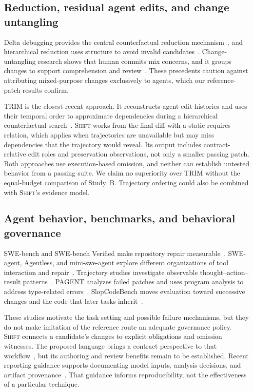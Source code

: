 \documentclass[a4paper,fleqn]{cas-sc}
\newcommand{\tool}{\textsc{Shift}}
\begin{document}
\subsection{Reduction, residual agent edits, and change untangling}

Delta debugging provides the central counterfactual reduction mechanism~\citep{zeller1999yesterday,zeller2002ddmin}, and hierarchical reduction uses structure to avoid invalid candidates~\citep{misherghi2006hdd}. Change-untangling research shows that human commits mix concerns, and it groups changes to support comprehension and review~\citep{herzig2013tangled,barnett2015untangle,dias2015untangling}. These precedents caution against attributing mixed-purpose changes exclusively to agents, which our reference-patch results confirm.

TRIM is the closest recent approach. It reconstructs agent edit histories and uses their temporal order to approximate dependencies during a hierarchical counterfactual search~\citep{mathai2026trim}. \tool{} works from the final diff with a static requires relation, which applies when trajectories are unavailable but may miss dependencies that the trajectory would reveal. Its output includes contract-relative edit roles and preservation observations, not only a smaller passing patch. Both approaches use execution-based omission, and neither can establish untested behavior from a passing suite. We claim no superiority over TRIM without the equal-budget comparison of Study~B. Trajectory ordering could also be combined with \tool{}'s evidence model.

\subsection{Agent behavior, benchmarks, and behavioral governance}

SWE-bench and SWE-bench Verified make repository repair measurable~\citep{jimenez2024swebench,chowdhury2024verified}. SWE-agent, Agentless, and mini-swe-agent explore different organizations of tool interaction and repair~\citep{yang2024sweagent,xia2025agentless,miniswe2025}. Trajectory studies investigate observable thought--action--result patterns~\citep{bouzenia2025trajectories}. PAGENT analyzes failed patches and uses program analysis to address type-related errors~\citep{xue2025pagent}. SlopCodeBench moves evaluation toward successive changes and the code that later tasks inherit~\citep{orlanski2026slopcodebench}.

These studies motivate the task setting and possible failure mechanisms, but they do not make imitation of the reference route an adequate governance policy. \tool{} connects a candidate's changes to explicit obligations and omission witnesses. The proposed language brings a contract perspective to that workflow~\citep{meyer1992dbc}, but its authoring and review benefits remain to be established. Recent reporting guidance supports documenting model inputs, analysis decisions, and artifact provenance~\citep{baltes2027guidelines}. That guidance informs reproducibility, not the effectiveness of a particular technique.
\end{document}
